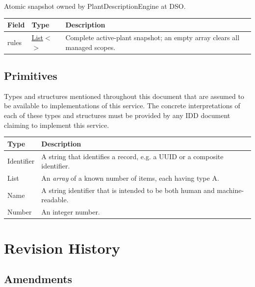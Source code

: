 \documentclass[a4paper]{arrowhead}
\newcommand{\mref}[2][]{{\textcolor{ArrowheadPurple}{\hyperref[sec:model:#2]{\ifstrempty{#1}{#2}{#1}}}}}
\newcommand{\pdef}[1]{{\textcolor{ArrowheadGrey}{#1\label{sec:model:primitives:#1}\label{sec:model:primitives:#1s}\label{sec:model:primitives:#1es}}}}
\newcommand{\pref}[1]{{\textcolor{ArrowheadGrey}{\hyperref[sec:model:primitives:#1]{#1}}}}
\begin{document}

Atomic snapshot owned by Plant\allowbreak{}Description\allowbreak{}Engine at DSO.


\noindent\begin{tabularx}{\textwidth}{| >{\raggedright\arraybackslash}p{3.9cm} | >{\raggedright\arraybackslash\small}p{5.3cm} | X |} \hline
\rowcolor{gray!33} Field & Type & Description \\ \hline
rules & \pref{List}$<$\allowbreak{}\mref{OrchestrationPlantRule}$>$ & Complete active-plant snapshot; an empty array clears all managed scopes. \\ \hline
\end{tabularx}



\subsection{Primitives}
\label{sec:model:primitives}

Types and structures mentioned throughout this document that are assumed to be available to implementations of this service.
The concrete interpretations of each of these types and structures must be provided by any IDD document claiming to implement this service.

\noindent\begin{tabularx}{\textwidth}{| p{4.6cm} | X |} \hline
\rowcolor{gray!33} Type & Description \\ \hline
\pdef{Identifier} & A string that identifies a record, e.g. a UUID or a composite identifier. \\ \hline
\pdef{List} & An \textit{array} of a known number of items, each having type A. \\ \hline
\pdef{Name} & A string identifier that is intended to be both human and machine-readable. \\ \hline
\pdef{Number} & An integer number. \\ \hline
\end{tabularx}

\newpage




\newpage

\section{Revision History}
\subsection{Amendments}
\end{document}

